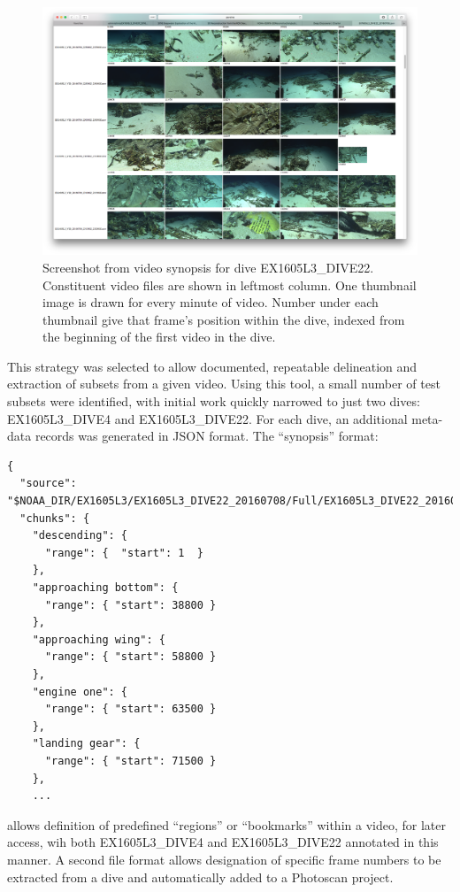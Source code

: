 \documentclass[letterpaper,12pt]{article}
\begin{document}
\begin{figure}[p]
    \centering
    \includegraphics[width=\textwidth]{images/thumbnailer_screenshot.png}
    \caption{Screenshot from video synopsis for dive EX1605L3\_DIVE22.   Constituent video files are shown in leftmost column.   One thumbnail image is drawn for every minute of video.  Number under each thumbnail give that frame's position within the dive, indexed from the beginning of the first video in the dive.}
    \label{img:thumbnails}
\end{figure}

This strategy was selected to allow documented, repeatable delineation and extraction of subsets from a given video.  Using this tool, a small number of test subsets were identified, with initial work quickly narrowed to just two dives: EX1605L3\_DIVE4 and EX1605L3\_DIVE22.  For each dive, an additional meta-data records was generated in JSON format.  The ``synopsis'' format:

\begin{Verbatim}[fontsize=\small]
{
  "source": "$NOAA_DIR/EX1605L3/EX1605L3_DIVE22_20160708/Full/EX1605L3_DIVE22_20160708.json",
  "chunks": {
    "descending": {
      "range": {  "start": 1  }
    },
    "approaching bottom": {
      "range": { "start": 38800 }
    },
    "approaching wing": {
      "range": { "start": 58800 }
    },
    "engine one": {
      "range": { "start": 63500 }
    },
    "landing gear": {
      "range": { "start": 71500 }
    },
    ...
\end{Verbatim}


\noindent allows definition of predefined ``regions'' or ``bookmarks'' within a video, for later access, wih both EX1605L3\_DIVE4 and EX1605L3\_DIVE22 annotated in this manner.  A second file format allows designation of specific frame numbers to be extracted from a dive and automatically added to a Photoscan project.
\end{document}
